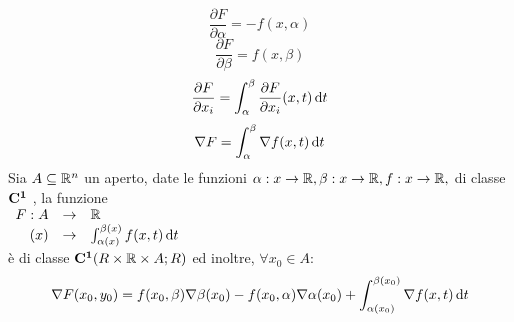 \[\frac{\partial F}{\partial \alpha}=-f(x,\alpha)\]
\[\frac{\partial F}{\partial \beta}=f(x,\beta)\]
\[\frac{\partial F}{\partial x_i}=\int_{\alpha}^{\beta}\frac{\partial F}{\partial x_i}(x,t)\,\mathrm{d}{t}\]
\[\nabla F=\int_{\alpha}^{\beta}\nabla f(x,t)\,\mathrm{d}{t}\]
\corollary
Sia $A\subseteq \mathbb{R}^n$ un aperto, date le funzioni $\alpha:x\rightarrow \mathbb{R}, \beta:x\rightarrow \mathbb{R}, f:x\rightarrow \mathbb{R}, $ di classe $\mathbf{C^{1}}$ , la funzione \\
$\begin{array}{rcl} F: A & \to & \mathbb{R} \\ (x) & \to & \int_{\alpha(x)}^{\beta(x)}f(x,t)\,\mathrm{d}{t} \end{array}$\\
è di classe $\mathbf{C^{1}}(R\times \mathbb{R}\times A;R)$ ed inoltre, $\forall x_0 \in A$:
\[\nabla F(x_0,y_0)=f(x_0,\beta)\nabla\beta(x_0)-f(x_0,\alpha)\nabla\alpha(x_0)+\int_{\alpha(x_0)}^{\beta(x_0)}\nabla f(x,t)\,\mathrm{d}{t}\]

\newpage
